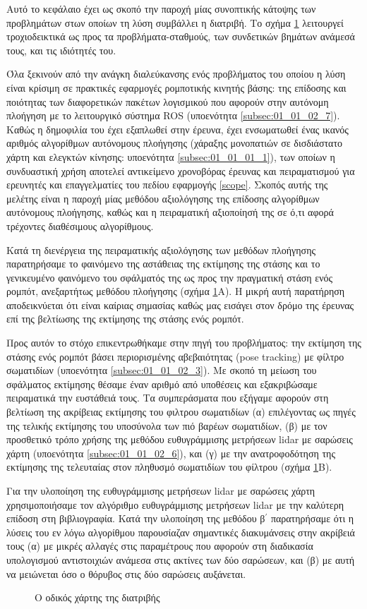 Αυτό το κεφάλαιο έχει ως σκοπό την παροχή μίας συνοπτικής κάτοψης των
προβλημάτων στων οποίων τη λύση συμβάλλει η διατριβή. Το σχήμα
\ref{fig:roadmap} λειτουργεί τροχιοδεικτικά ως προς τα προβλήματα-σταθμούς,
των συνδετικών βημάτων ανάμεσά τους, και τις ιδιότητές του.


Όλα ξεκινούν από την ανάγκη διαλεύκανσης ενός προβλήματος του οποίου η λύση
είναι κρίσιμη σε πρακτικές εφαρμογές ρομποτικής κινητής βάσης: της επίδοσης και
ποιότητας των διαφορετικών πακέτων λογισμικού που αφορούν στην αυτόνομη
πλοήγηση με το λειτουργικό σύστημα ROS (υποενότητα \ref{subsec:01_01_02_7}).
Καθώς η δημοφιλία του έχει εξαπλωθεί στην έρευνα, έχει ενσωματωθεί ένας ικανός
αριθμός αλγορίθμων αυτόνομους πλοήγησης (χάραξης μονοπατιών σε δισδιάστατο
χάρτη και ελεγκτών κίνησης: υποενότητα \ref{subsec:01_01_01_1}), των οποίων η
συνδυαστική χρήση αποτελεί αντικείμενο χρονοβόρας έρευνας και πειραματισμού για
ερευνητές και επαγγελματίες του πεδίου εφαρμογής \ref{scope}. Σκοπός αυτής της
μελέτης είναι η παροχή μίας μεθόδου αξιολόγησης της επίδοσης αλγορίθμων
αυτόνομους πλοήγησης, καθώς και η πειραματική αξιοποίησή της σε ό,τι αφορά
τρέχοντες διαθέσιμους αλγορίθμους.

Κατά τη διενέργεια της πειραματικής αξιολόγησης των μεθόδων πλοήγησης
παρατηρήσαμε το φαινόμενο της αστάθειας της εκτίμησης της στάσης και το
γενικευμένο φαινόμενο του σφάλματός της ως προς την πραγματική στάση ενός
ρομπότ, ανεξαρτήτως μεθόδου πλοήγησης (σχήμα \ref{fig:roadmap}Α). Η μικρή αυτή
παρατήρηση αποδεικνύεται ότι είναι καίριας σημασίας καθώς μας εισάγει στον
δρόμο της έρευνας επί της βελτίωσης της εκτίμησης της στάσης ενός ρομπότ.


Προς αυτόν το στόχο επικεντρωθήκαμε στην πηγή του προβλήματος: την εκτίμηση της
στάσης ενός ρομπότ βάσει περιορισμένης αβεβαιότητας (pose tracking) με φίλτρο
σωματιδίων (υποενότητα \ref{subsec:01_01_02_3}). Με σκοπό τη μείωση του
σφάλματος εκτίμησης θέσαμε έναν αριθμό από υποθέσεις και εξακριβώσαμε
πειραματικά την ευστάθειά τους. Τα συμπεράσματα που εξήγαμε αφορούν στη
βελτίωση της ακρίβειας εκτίμησης του φιλτρου σωματιδίων (α) επιλέγοντας ως
πηγές της τελικής εκτίμησης του υποσύνολα των πιό βαρέων σωματιδίων, (β) με τον
προσθετικό τρόπο χρήσης της μεθόδου ευθυγράμμισης μετρήσεων lidar με σαρώσεις
χάρτη (υποενότητα \ref{subsec:01_01_02_6}), και (γ) με την ανατροφοδότηση της
εκτίμησης της τελευταίας στον πληθυσμό σωματιδίων του φίλτρου (σχήμα
\ref{fig:roadmap}Β).

Για την υλοποίηση της ευθυγράμμισης μετρήσεων lidar με σαρώσεις χάρτη
χρησιμοποιήσαμε τον αλγόριθμο ευθυγράμμισης μετρήσεων lidar με την καλύτερη
επίδοση στη βιβλιογραφία. Κατά την υλοποίηση της μεθόδου β$^\prime$ παρατηρήσαμε
ότι η λύσεις του εν λόγω αλγορίθμου παρουσίαζαν σημαντικές διακυμάνσεις στην
ακρίβειά τους (α) με μικρές αλλαγές στις παραμέτρους που αφορούν στη διαδικασία
υπολογισμού αντιστοιχιών ανάμεσα στις ακτίνες των δύο σαρώσεων, και (β) με αυτή
να μειώνεται όσο ο θόρυβος στις δύο σαρώσεις αυξάνεται.






\begin{figure}\hspace{-2cm}
  
  \caption{Ο οδικός χάρτης της διατριβής}
  \label{fig:roadmap}
\end{figure}
